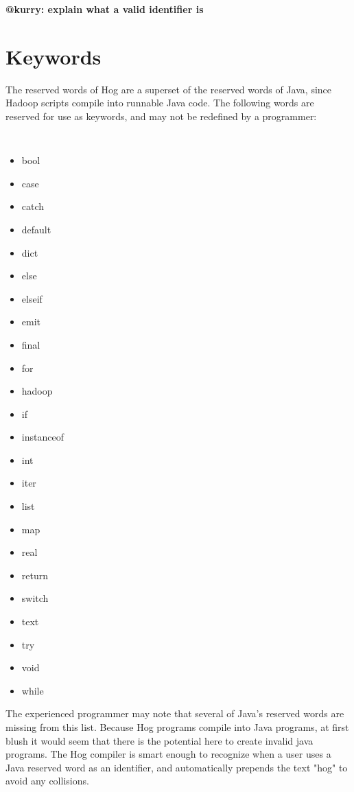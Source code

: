\documentclass{book}
\begin{document}
\textbf{@kurry: explain what a valid identifier is}


\section{Keywords} %
\label{sec:keywords}

The reserved words of Hog are a superset of the reserved words of Java, since
Hadoop scripts compile into runnable Java code. The following words are reserved
for use as keywords, and may not be redefined by a programmer:

\begin{multicols}{4}
\tt
\begin{itemize}
  \item[] bool
  \item[] case
  \item[] catch
  \item[] default
  \item[] dict
  \item[] else
  \item[] elseif
  \item[] emit
  \item[] final
  \item[] for
  \item[] hadoop
  \item[] if
  \item[] instanceof
  \item[] int
  \item[] iter
  \item[] list
  \item[] map
  \item[] real
  \item[] return
  \item[] switch
  \item[] text
  \item[] try
  \item[] void
  \item[] while
\end{itemize}
\rm
\end{multicols}

The experienced programmer may note that several of Java's reserved words are missing from this list. Because Hog programs
compile into Java programs, at first blush it would seem that there is the potential here to create invalid java programs. The
Hog compiler is smart enough to recognize when a user uses a Java reserved word as an identifier, and automatically prepends
the text "hog" to avoid any collisions.
\end{document}
